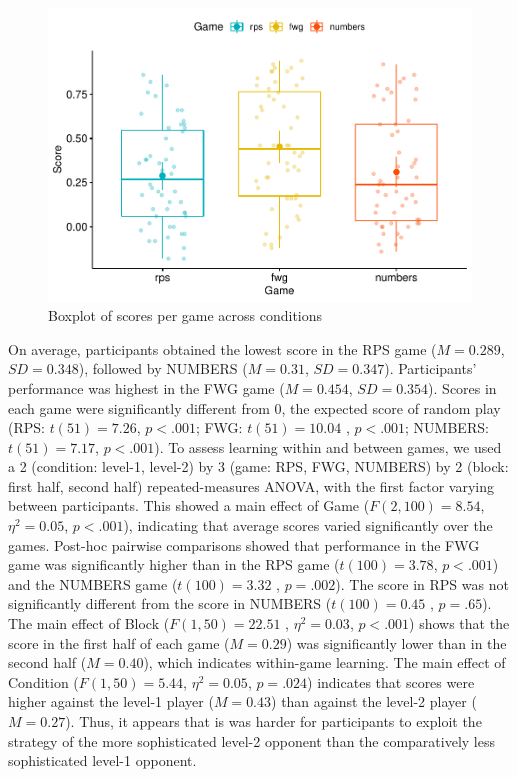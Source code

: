 \documentclass[man,floatsintext]{apa6}
\begin{document}
\begin{figure}

{\centering \includegraphics{paper_draft_2021_files/figure-latex/exp1-avg-scores-game-1} 

}

\caption{Boxplot of scores per game across conditions}\label{fig:exp1-avg-scores-game}
\end{figure}

On average, participants obtained the lowest score in the RPS game (\(M = 0.289\), \(SD = 0.348\)), followed by NUMBERS (\(M = 0.31\), \(SD = 0.347\)). Participants' performance was highest in the FWG game (\(M = 0.454\), \(SD = 0.354\)). Scores in each game were significantly different from 0, the expected score of random play (RPS: \(t(51) = 7.26\), \(p < .001\); FWG: \(t(51) = 10.04\) , \(p < .001\); NUMBERS: \(t(51) = 7.17\), \(p < .001\)). To assess learning within and between games, we used a 2 (condition: level-1, level-2) by 3 (game: RPS, FWG, NUMBERS) by 2 (block: first half, second half) repeated-measures ANOVA, with the first factor varying between participants. This showed a main effect of Game (\(F(2,100) = 8.54\), \(\eta^{2} = 0.05\), \(p < .001\)), indicating that average scores varied significantly over the games. Post-hoc pairwise comparisons showed that performance in the FWG game was significantly higher than in the RPS game (\(t(100) =3.78\), \(p < .001\)) and the NUMBERS game (\(t(100) = 3.32\) , \(p = .002\)). The score in RPS was not significantly different from the score in NUMBERS (\(t(100) = 0.45\) , \(p = .65\)). The main effect of Block (\(F(1,50) = 22.51\) , \(\eta^{2} = 0.03\), \(p < .001\)) shows that the score in the first half of each game (\(M = 0.29\)) was significantly lower than in the second half (\(M = 0.40\)), which indicates within-game learning. The main effect of Condition (\(F(1,50) = 5.44\), \(\eta^{2} = 0.05\), \(p = .024\)) indicates that scores were higher against the level-1 player (\(M = 0.43\)) than against the level-2 player (\(M = 0.27\)). Thus, it appears that is was harder for participants to exploit the strategy of the more sophisticated level-2 opponent than the comparatively less sophisticated level-1 opponent.
\end{document}
